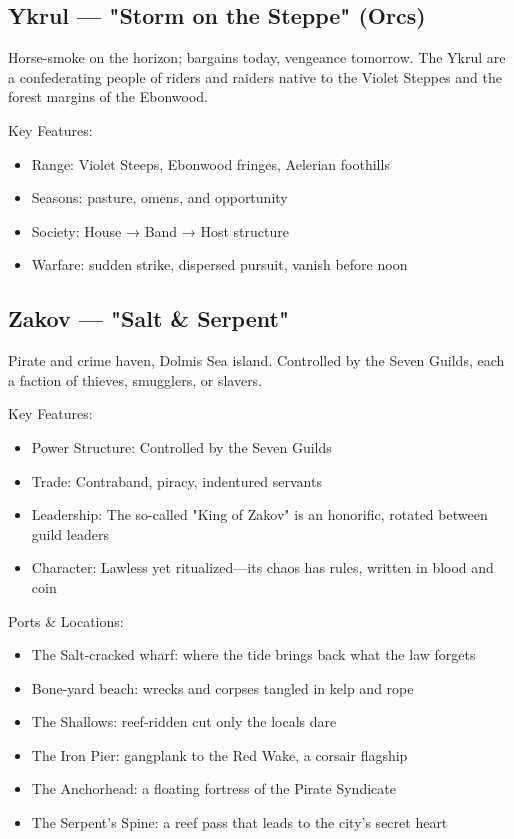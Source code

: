 \subsection{Ykrul — "Storm on the Steppe" (Orcs)}
\label{sec:ykrul}

Horse-smoke on the horizon; bargains today, vengeance tomorrow. The Ykrul are a confederating people of riders and raiders native to the Violet Steppes and the forest margins of the Ebonwood.

Key Features:
\begin{itemize}
    \item Range: Violet Steeps, Ebonwood fringes, Aelerian foothills
    \item Seasons: pasture, omens, and opportunity
    \item Society: House → Band → Host structure
    \item Warfare: sudden strike, dispersed pursuit, vanish before noon
\end{itemize}

\subsection{Zakov — "Salt \& Serpent"}
\label{sec:zakov}

Pirate and crime haven, Dolmis Sea island. Controlled by the Seven Guilds, each a faction of thieves, smugglers, or slavers.

Key Features:
\begin{itemize}
    \item Power Structure: Controlled by the Seven Guilds
    \item Trade: Contraband, piracy, indentured servants
    \item Leadership: The so-called "King of Zakov" is an honorific, rotated between guild leaders
    \item Character: Lawless yet ritualized—its chaos has rules, written in blood and coin
\end{itemize}

Ports \& Locations:
\begin{itemize}
    \item The Salt-cracked wharf: where the tide brings back what the law forgets
    \item Bone-yard beach: wrecks and corpses tangled in kelp and rope
    \item The Shallows: reef-ridden cut only the locals dare
    \item The Iron Pier: gangplank to the Red Wake, a corsair flagship
    \item The Anchorhead: a floating fortress of the Pirate Syndicate
    \item The Serpent's Spine: a reef pass that leads to the city's secret heart
\end{itemize}


